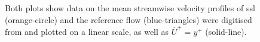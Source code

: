 \begin{figure}[htbp]
	\centering
		\caption{Both plots show data on the mean streamwise velocity profiles of \gls{ssl} (orange-circle) and the reference flow (blue-triangles) were digitised from \textcite{viotti2009} and plotted on a linear scale, as well as $\overline{U}^+=y^+$ (solid-line). }
	\label{fig:sslmplin}
\end{figure}

